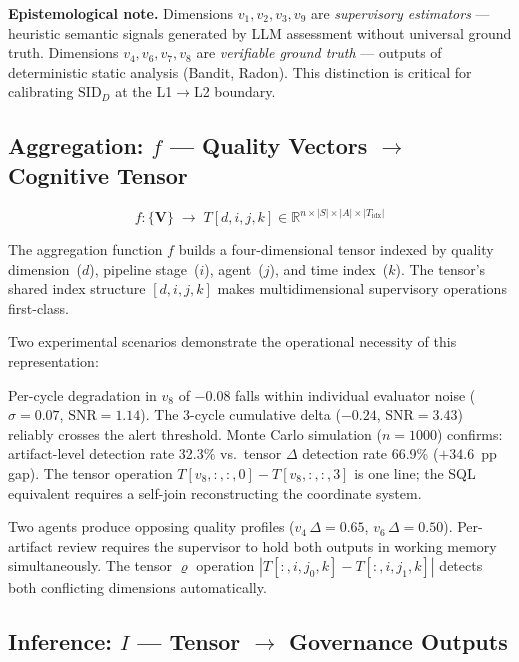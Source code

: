\documentclass[11pt]{article}
\theoremstyle{definition}
\theoremstyle{remark}
\begin{document}
\medskip
\noindent\textbf{Epistemological note.} Dimensions $v_1, v_2, v_3,
v_9$ are \emph{supervisory estimators} --- heuristic semantic
signals generated by LLM assessment without universal ground truth.
Dimensions $v_4, v_6, v_7, v_8$ are \emph{verifiable ground truth}
--- outputs of deterministic static analysis (Bandit, Radon). This
distinction is critical for calibrating $\text{SID}_D$ at the
L1$\to$L2 boundary.

\subsection{Aggregation: $f$ --- Quality Vectors $\to$ Cognitive Tensor}

\[
  f: \{\mathbf{V}\} \;\to\; T[d,i,j,k] \in
  \mathbb{R}^{n \times |S| \times |A| \times |T_{\mathrm{idx}}|}
\]

The aggregation function $f$ builds a four-dimensional tensor indexed
by quality dimension~($d$), pipeline stage~($i$), agent~($j$), and
time index~($k$). The tensor's shared index structure
$[d,i,j,k]$ makes multidimensional supervisory operations
first-class.

Two experimental scenarios demonstrate the operational necessity of
this representation:

\begin{description}[leftmargin=0pt]
  \item[S3 --- Gradual technical debt.] Per-cycle degradation in
  $v_8$ of $-0.08$ falls within individual evaluator noise
  ($\sigma{=}0.07$, $\text{SNR}{=}1.14$). The 3-cycle cumulative
  delta ($-0.24$, $\text{SNR}{=}3.43$) reliably crosses the alert
  threshold. Monte Carlo simulation ($n{=}1000$) confirms:
  artifact-level detection rate 32.3\% vs.\ tensor $\Delta$
  detection rate 66.9\% ($+34.6$~pp gap). The tensor operation
  $T[v_8,:,:,0] - T[v_8,:,:,3]$ is one line; the SQL equivalent
  requires a self-join reconstructing the coordinate system.

  \item[S5 --- Inter-agent conflict.] Two agents produce opposing
  quality profiles ($v_4\,\Delta{=}0.65$, $v_6\,\Delta{=}0.50$).
  Per-artifact review requires the supervisor to hold both outputs in
  working memory simultaneously. The tensor $\varrho$ operation
  $|T[:,i,j_0,k] - T[:,i,j_1,k]|$ detects both conflicting
  dimensions automatically.
\end{description}

\subsection{Inference: $I$ --- Tensor $\to$ Governance Outputs}
\end{document}
